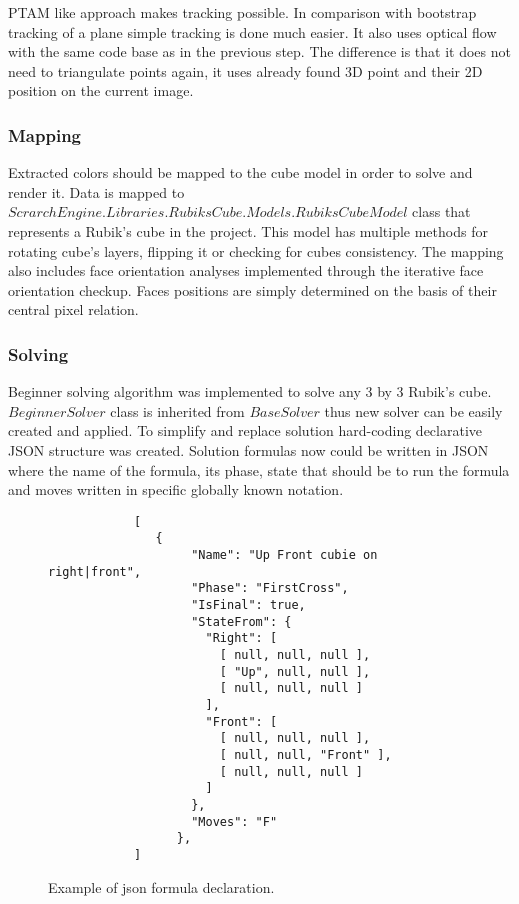 \documentclass[../../main.tex]{subfiles}
\begin{document}
\ac{PTAM} like approach makes tracking possible. In comparison with bootstrap tracking of a plane simple tracking is done much easier. It also uses optical flow with the same code base as in the previous step. The difference is that it does not need to triangulate points again, it uses already found 3D point and their 2D position on the current image.

\subsubsection*{Mapping}

Extracted colors should be mapped to the cube model in order to solve and render it. Data is mapped to $ScrarchEngine.Libraries.RubiksCube.Models.RubiksCubeModel$ class that represents a Rubik's cube in the project. This model has multiple methods for rotating cube's layers, flipping it or checking for cubes consistency. The mapping also includes face orientation analyses implemented through the iterative face orientation checkup. Faces positions are simply determined on the basis of their central pixel relation.

\subsubsection*{Solving}

Beginner solving algorithm was implemented to solve any 3 by 3 Rubik's cube. $BeginnerSolver$ class is inherited from $BaseSolver$ thus new solver can be easily created and applied. To simplify and replace solution hard-coding declarative \ac{JSON} structure was created. Solution formulas now could be written in \ac{JSON} where the name of the formula, its phase, state that should be to run the formula and moves written in specific globally known notation.

\begin{figure} [!ht]
  \centering    
    \lstset{style=sharpc}
        \begin{lstlisting}
            [
               {
                    "Name": "Up Front cubie on right|front",
                    "Phase": "FirstCross",
                    "IsFinal": true,
                    "StateFrom": {
                      "Right": [
                        [ null, null, null ],
                        [ "Up", null, null ],
                        [ null, null, null ]
                      ],
                      "Front": [
                        [ null, null, null ],
                        [ null, null, "Front" ],
                        [ null, null, null ]
                      ]
                    },
                    "Moves": "F"
                  },
            ]     
        \end{lstlisting}
  \caption{Example of json formula declaration.}
  \label{jsonsolformuladecl}
\end{figure}
\end{document}
